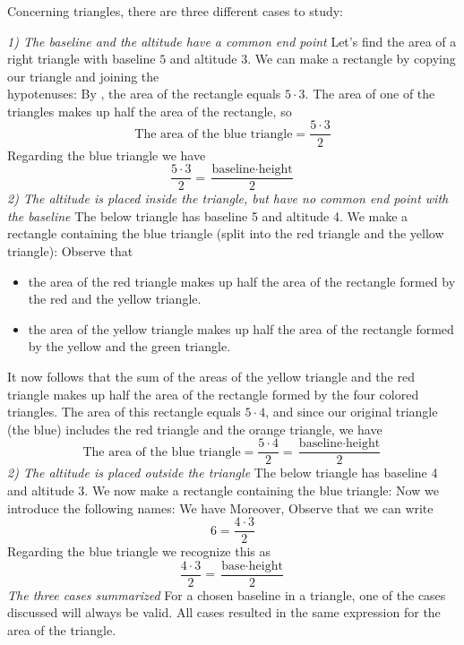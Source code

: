 \subsubsection{\artri \label{artri}}
Concerning triangles, there are three different cases to study: \vsk

\textit{1) The baseline and the altitude have a common end point} \os
Let's find the area of a right triangle with baseline $ 5 $ and altitude $ 3 $.
We can make a rectangle by copying our triangle and joining the \\hypotenuses:
By , the area of the rectangle equals $ {5\cdot 3} $. The area of one of the triangles makes up half the area of the rectangle, so
\[ \text{The area of the blue triangle} = \frac{5\cdot 3}{2} \]
Regarding the blue triangle we have
\[\frac{5\cdot3}{2}= \frac{\text{baseline}\cdot \text{height}}{2} \]
\newpage
\textit{2) The altitude is placed inside the triangle, but have no common end point with the baseline} \os
The below triangle has baseline 5 and altitude 4.
We make a rectangle containing the blue triangle (split into the red triangle and the yellow triangle):
Observe that
\begin{itemize}
	\item the area of the red triangle makes up half the area of the rectangle formed by the red and the yellow triangle.
	\item the area of the yellow triangle makes up half the area of the rectangle formed by the yellow and the green triangle.
\end{itemize}
It now follows that the sum of the areas of the yellow triangle and the red triangle makes up half the area of the rectangle formed by the four colored triangles. The area of this rectangle equals $ 5\cdot4 $, and since our original triangle (the blue) includes the red triangle and the orange triangle, we have
\[ \text{The area of the blue triangle}=\frac{5\cdot4}{2}=\frac{\text{baseline}\cdot\text{height}}{2} \] 
\newpage
\textit{2) The altitude is placed outside the triangle} \os
The below triangle has baseline 4 and altitude 3. 
We now make a rectangle containing the blue triangle:
Now we introduce the following names:
We have
Moreover,
Observe that we can write
\[ 6=\frac{4\cdot3}{2} \]
Regarding the blue triangle we recognize this as 
\[ \frac{4\cdot3}{2}=\frac{\text{base}\cdot\text{height}}{2} \]
\newpage
\textit{The three cases summarized}\os
For a chosen baseline in a triangle, one of the cases discussed will always be valid. All cases resulted in the same expression for the area of the triangle.\regv

